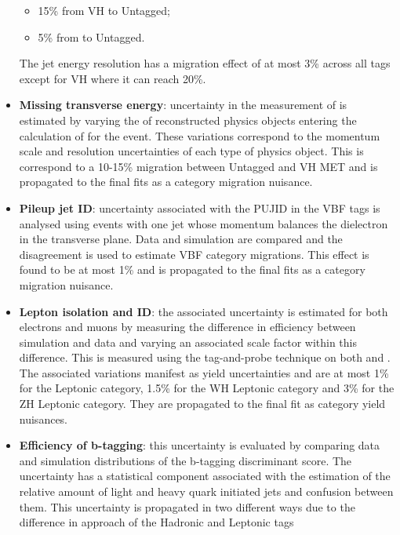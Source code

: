 \begin{itemize}[noitemsep]
{\begin{itemize}[noitemsep]
               \item[\textbullet] 15\% from VH to Untagged;
               \item[\textbullet] 5\% from \ttH to Untagged.
           \end{itemize}
           The jet energy resolution has a migration effect of at most 3\% across all tags except for VH where it can reach 20\%.
           }
    \item {\textbf{Missing transverse energy}: 
           uncertainty in the measurement of \MET is estimated by varying the \pt of reconstructed physics objects entering the calculation of \MET for the event. 
           These variations correspond to the momentum scale and resolution uncertainties of each type of physics object. 
           This is correspond to a 10-15\% migration between Untagged and VH MET and is propagated to the final fits as a category migration nuisance.
           }
    \item {\textbf{Pileup jet ID}: 
           uncertainty associated with the PUJID in the VBF tags is analysed using \Zee events with one jet whose momentum balances the dielectron in the transverse plane.            
           Data and simulation are compared and the disagreement is used to estimate VBF category migrations. This effect is found to be at most 1\% and is propagated to the final fits as a category migration nuisance. 
           }
    \item {\textbf{Lepton isolation and ID}: 
           the associated uncertainty is estimated for both electrons and muons by measuring the difference in efficiency between simulation and data and varying an associated scale factor within this difference. 
           This is measured using the tag-and-probe technique on both \Zee and \Zmumu.
           The associated variations manifest as yield uncertainties and are at most 1\% for the \ttH Leptonic category, 1.5\% for the WH Leptonic category and 3\% for the ZH Leptonic category. They are propagated to the final fit as category yield nuisances. 
           }
    \item {\textbf{Efficiency of b-tagging}: 
           this uncertainty is evaluated by comparing data and simulation distributions of the b-tagging discriminant score. The uncertainty has a statistical component associated with the estimation of the relative amount of light and heavy quark initiated jets and confusion between them. 
           This uncertainty is propagated in two different ways due to the difference in approach of the \ttH Hadronic and \ttH Leptonic tags
}
\end{itemize}
